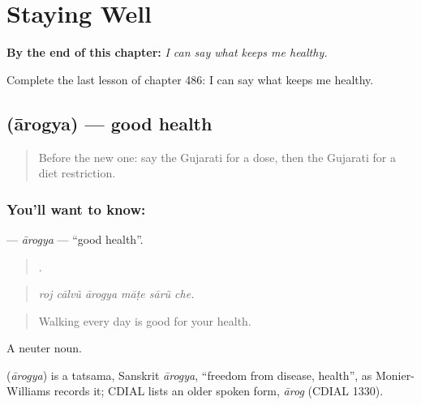 
\chapter{Staying Well}
\label{ch:gu-staying-well}

\begin{chapteropening}
\textbf{By the end of this chapter:} \emph{I can say what keeps me healthy.}

Complete the last lesson of chapter 486: I can say what keeps me healthy.
\end{chapteropening}

\section[\texorpdfstring{\gu{આરોગ્ય} (ārogya)}{આરોગ્ય (ārogya)}]{ (ārogya) — good health}

\label{lesson:GU-C486-arogya}



\begin{quote}
Before the new one: say the Gujarati for a dose, then the Gujarati for a diet restriction.
\end{quote}

\subsection*{You'll want to know: }
\textbf{} — \emph{ārogya} — \textquotedblleft{}good health\textquotedblright{}.

\begin{quote}
     .
\end{quote}

\begin{quote}
\emph{roj cālvũ ārogya māṭe sārũ che.}
\end{quote}

\begin{quote}
Walking every day is good for your health.
\end{quote}

A neuter noun.

\begin{cousinweb}
\textbf{} (\emph{ārogya}) is a tatsama, Sanskrit \emph{ārogya}, \textquotedblleft{}freedom from disease, health\textquotedblright{}, as Monier-Williams records it; CDIAL lists an older spoken form, \emph{ārog} (CDIAL 1330).
\end{cousinweb}

